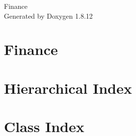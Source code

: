 \documentclass[twoside]{book}
\newcommand{\+}{\discretionary{\mbox{\scriptsize$\hookleftarrow$}}{}{}}
\newcommand{\clearemptydoublepage}{%
  \newpage{\pagestyle{empty}\cleardoublepage}%
}
\begin{document}
\hypersetup{pageanchor=false,
             bookmarksnumbered=true,
             pdfencoding=unicode
            }
\begin{titlepage}
\vspace*{7cm}
\begin{center}%
{\Large Finance }\\
\vspace*{1cm}
{\large Generated by Doxygen 1.8.12}\\
\end{center}
\end{titlepage}
\clearemptydoublepage
{}
\tableofcontents
\clearemptydoublepage
{}
\hypersetup{pageanchor=true}

\chapter{Finance}
\label{md__users__c_u_i__dropbox__c_09_09__finance__r_e_a_d_m_e}
\hypertarget{md__users__c_u_i__dropbox__c_09_09__finance__r_e_a_d_m_e}{}

\chapter{Hierarchical Index}

\chapter{Class Index}

\end{document}
